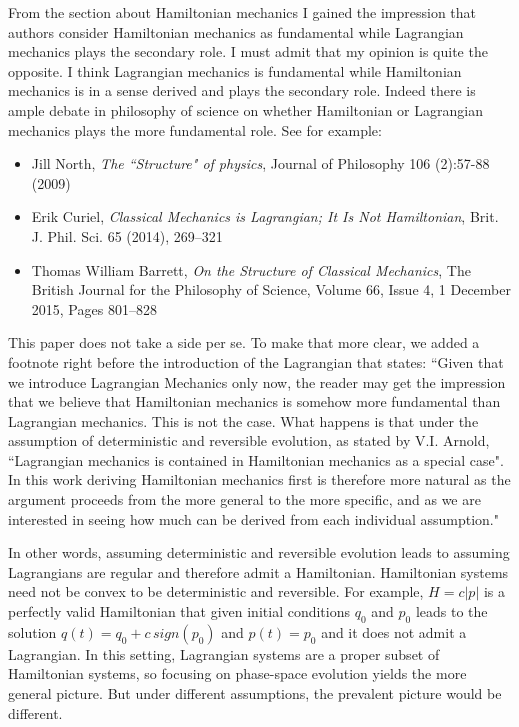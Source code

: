 \documentclass[10pt]{article}
\begin{document}
\begin{response}{From the section about Hamiltonian mechanics I gained the impression that authors
consider Hamiltonian mechanics as fundamental while Lagrangian mechanics plays the
secondary role. I must admit that my opinion is quite the opposite. I think Lagrangian
mechanics is fundamental while Hamiltonian mechanics is in a sense derived and plays
the secondary role.}
Indeed there is ample debate in philosophy of science on whether Hamiltonian or Lagrangian mechanics plays the more fundamental role. See for example:
\begin{itemize}
	\item Jill North, \emph{The ``Structure" of physics}, 
	Journal of Philosophy 106 (2):57-88 (2009)
	\item  Erik Curiel, \emph{Classical Mechanics is Lagrangian; It Is Not Hamiltonian}, Brit. J. Phil. Sci. 65 (2014), 269–321
	\item Thomas William Barrett, \emph{On the Structure of Classical Mechanics},	
	The British Journal for the Philosophy of Science, Volume 66, Issue 4, 1 December 2015, Pages 801–828
\end{itemize}

This paper does not take a side per se. To make that more clear, we added a footnote right before the introduction of the Lagrangian that states: ``Given that we introduce Lagrangian Mechanics only now, the reader may get the impression that we believe that Hamiltonian mechanics is somehow more fundamental than Lagrangian mechanics. This is not the case. What happens is that under the assumption of deterministic and reversible evolution, as stated by V.I. Arnold, ``Lagrangian mechanics is contained in Hamiltonian mechanics as a special case". In this work deriving Hamiltonian mechanics first is therefore more natural as the argument proceeds from the more general to the more specific, and as we are interested in seeing how much can be derived from each individual assumption."

In other words, assuming deterministic and reversible evolution leads to assuming Lagrangians are regular and therefore admit a Hamiltonian. Hamiltonian systems need not be convex to be deterministic and reversible. For example, $H=c|p|$ is a perfectly valid Hamiltonian that given initial conditions $q_0$ and $p_0$ leads to the solution $q(t)=q_0 + c \, sign(p_0)$ and $p(t)=p_0$ and it does not admit a Lagrangian. In this setting, Lagrangian systems are a proper subset of Hamiltonian systems, so focusing on phase-space evolution yields the more general picture. But under different assumptions, the prevalent picture would be different.

\end{response}
\end{document}
